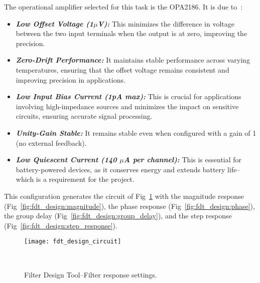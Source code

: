 The operational amplifier selected for this task is the OPA2186. It is due to~\cite{opax186_datasheet}:

\begin{itemize}
    \item \textit{\textbf{Low Offset Voltage (1$\mu$V):}} This minimizes the difference in voltage between the two input terminals when the output is at zero, improving the precision.

    \item \textit{\textbf{Zero-Drift Performance:}} It maintains stable performance across varying temperatures, ensuring that the offset voltage remains consistent and improving precision in applications.

    \item \textit{\textbf{Low Input Bias Current (1pA max):}} This is crucial for applications involving high-impedance sources and minimizes the impact on sensitive circuits, ensuring accurate signal processing.

    \item \textit{\textbf{Unity-Gain Stable:}} It remains stable even when configured with a gain of 1 (no external feedback).

    \item \textit{\textbf{Low Quiescent Current (140 $\mu$A per channel):}} This is essential for battery-powered devices, as it conserves energy and extends battery life--which is a requirement for the project.
\end{itemize}

This configuration generates the circuit of Fig~\ref{fig:fdt_design_circuit} with the magnitude response (Fig~\ref{fig:fdt_design:magnitude}), the phase response (Fig~\ref{fig:fdt_design:phase}), the group delay (Fig~\ref{fig:fdt_design:group_delay}), and the step response (Fig~\ref{fig:fdt_design:step_response}).

\begin{figure}[H]
    \centering
    \texttt{[image: fdt\_design\_circuit]}
    \caption{Filter Design Tool--Filter response settings.}
~\label{fig:fdt_design_circuit}
\end{figure}

